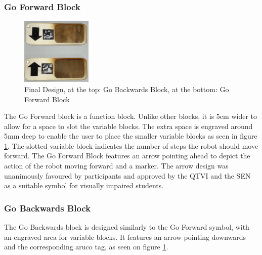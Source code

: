 \documentclass[oneside,%
                    author={Malak Hajji},
                    degree={BSc},
                    title={Designing An Accessible Computational Toolkit For Students},
                  subtitle={With Mixed Visual Abilities}]{dissertation}
\begin{document}
\subsubsection{Go Forward Block}
\FloatBarrier
\begin{figure}[h]
    \centering
    \includegraphics[width=0.3\textwidth]{thesis/backandforth.eps}
    \caption{Final Design, at the top: Go Backwards  Block, at the bottom: Go Forward Block}
    \label{fig-gobackandforth}
\end{figure}
\FloatBarrier
The Go Forward block is a function block. Unlike other blocks, it is 5cm wider to allow for a space to slot the variable blocks. The extra space is engraved around 5mm deep to enable the user to place the smaller variable blocks as seen in figure \ref{fig-gobackandforth}. The slotted variable block indicates the number of steps the robot should move forward. The Go Forward Block features an arrow pointing ahead to depict the action of the robot moving forward and a marker. The arrow design was unanimously favoured by participants and approved by the QTVI and the SEN as a suitable symbol for visually impaired students. 

\subsubsection{Go Backwards Block}
The Go Backwards block is designed similarly to the Go Forward symbol, with an engraved area for variable blocks. It features an arrow pointing downwards and the corresponding aruco tag, as seen on figure \ref{fig-gobackandforth}.
\end{document}
